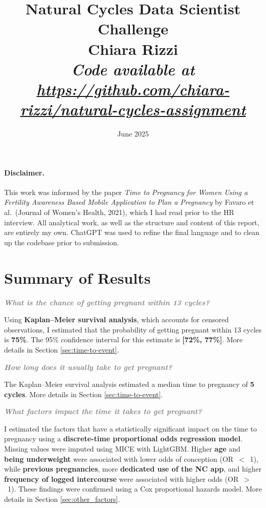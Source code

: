 \documentclass[11pt]{article}
\title{
  \textbf{Natural Cycles Data Scientist Challenge} \\
  \large Chiara Rizzi \\
  \vspace{0.3cm}
  \normalsize\textit{Code available at \url{https://github.com/chiara-rizzi/natural-cycles-assignment}}
}\date{June 2025}
\newcommand{\questiontext}[1]{\vspace{0.5em}\textbf{\textit{\textcolor{gray}{#1}}}}
\begin{document}
\maketitle
\thispagestyle{fancy}

\tableofcontents
\newpage

\paragraph{Disclaimer.} This work was informed by the paper \textit{Time to Pregnancy for Women Using a Fertility Awareness Based Mobile Application to Plan a Pregnancy} by Favaro et al.\ (Journal of Women's Health, 2021), which I had read prior to the HR interview. 
All analytical work, as well as the structure and content of this report, are entirely my own. ChatGPT was used to refine the final language and to clean up the codebase prior to submission.


\vspace{1em}

\section{Summary of Results}

\questiontext{What is the chance of getting pregnant within 13 cycles?}

Using \textbf{Kaplan–Meier survival analysis}, which accounts for censored observations, I estimated that the probability of getting pregnant within 13 cycles is \textbf{75\%}. The 95\% confidence interval for this estimate is \textbf{[72\%, 77\%]}. More details in Section \ref{sec:time-to-event}.


\questiontext{How long does it usually take to get pregnant?}

The Kaplan–Meier survival analysis estimated a median time to pregnancy of \textbf{5 cycles}. More details in Section \ref{sec:time-to-event}.


\questiontext{What factors impact the time it takes to get pregnant?}

I estimated the factors that have a statistically significant impact on the time to pregnancy using a \textbf{discrete-time proportional odds regression model}. Missing values were imputed using MICE with LightGBM. Higher \textbf{age} and \textbf{being underweight} were associated with lower odds of conception (OR~$<$~1), while \textbf{previous pregnancies}, more \textbf{dedicated use of the NC app}, and higher \textbf{frequency of logged intercourse} were associated with higher odds (OR~$>$~1). These findings were confirmed using a Cox proportional hazards model. More details in Section \ref{sec:other_factors}.
\end{document}
